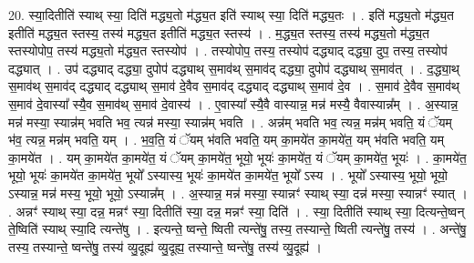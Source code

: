 \documentclass[17pt]{extarticle}
\begin{document}
20. स्या॒दितीति॑ स्याथ् स्या॒ दिति॑ मद्ध्य॒तो म॑द्ध्य॒त इति॑ स्याथ् स्या॒ दिति॑ मद्ध्य॒तः । . इति॑ मद्ध्य॒तो म॑द्ध्य॒त इतीति॑ मद्ध्य॒त स्तस्य॒ तस्य॑ मद्ध्य॒त इतीति॑ मद्ध्य॒त स्तस्य॑ । . म॒द्ध्य॒त स्तस्य॒ तस्य॑ मद्ध्य॒तो म॑द्ध्य॒त स्तस्योपोप॒ तस्य॑ मद्ध्य॒तो म॑द्ध्य॒त स्तस्योप॑ । . तस्योपोप॒ तस्य॒ तस्योप॑ दद्ध्याद् दद्ध्या॒ दुप॒ तस्य॒ तस्योप॑ दद्ध्यात् । . उप॑ दद्ध्याद् दद्ध्या॒ दुपोप॑ दद्ध्याथ् स॒माव॑थ् स॒माव॑द् दद्ध्या॒ दुपोप॑ दद्ध्याथ् स॒माव॑त् । . द॒द्ध्या॒थ् स॒माव॑थ् स॒माव॑द् दद्ध्याद् दद्ध्याथ् स॒माव॑ दे॒वैव स॒माव॑द् दद्ध्याद् दद्ध्याथ् स॒माव॑ दे॒व । . स॒माव॑ दे॒वैव स॒माव॑थ् स॒माव॑ दे॒वास्या᳚ स्यै॒व स॒माव॑थ् स॒माव॑ दे॒वास्य॑ । . ए॒वास्या᳚ स्यै॒वै वास्यान्न॒ मन्न॑ मस्यै॒ वैवास्यान्न᳚म् । . अ॒स्यान्न॒ मन्न॑ मस्या॒ स्यान्न॑म् भवति भव॒ त्यन्न॑ मस्या॒ स्यान्न॑म् भवति । . अन्न॑म् भवति भव॒ त्यन्न॒ मन्न॑म् भवति॒ यं ॅयम् भ॑व॒ त्यन्न॒ मन्न॑म् भवति॒ यम् । . भ॒व॒ति॒ यं ॅयम् भ॑वति भवति॒ यम् का॒मये॑त का॒मये॑त॒ यम् भ॑वति भवति॒ यम् का॒मये॑त । . यम् का॒मये॑त का॒मये॑त॒ यं ॅयम् का॒मये॑त॒ भूयो॒ भूयः॑ का॒मये॑त॒ यं ॅयम् का॒मये॑त॒ भूयः॑ । . का॒मये॑त॒ भूयो॒ भूयः॑ का॒मये॑त का॒मये॑त॒ भूयो᳚ ऽस्यास्य॒ भूयः॑ का॒मये॑त का॒मये॑त॒ भूयो᳚ ऽस्य । . भूयो᳚ ऽस्यास्य॒ भूयो॒ भूयो॒ ऽस्यान्न॒ मन्न॑ मस्य॒ भूयो॒ भूयो॒ ऽस्यान्न᳚म् । . अ॒स्यान्न॒ मन्न॑ मस्या॒ स्यान्नꣳ॑ स्याथ् स्या॒ दन्न॑ मस्या॒ स्यान्नꣳ॑ स्यात् । . अन्नꣳ॑ स्याथ् स्या॒ दन्न॒ मन्नꣳ॑ स्या॒ दितीति॑ स्या॒ दन्न॒ मन्नꣳ॑ स्या॒ दिति॑ । . स्या॒ दितीति॑ स्याथ् स्या॒ दित्यन्ते॒ष्वन् ते॒ष्विति॑ स्याथ् स्या॒दि त्यन्ते॑षु । . इत्यन्ते॒ ष्वन्ते॒ ष्विती त्यन्ते॑षु॒ तस्य॒ तस्यान्ते॒ ष्विती त्यन्ते॑षु॒ तस्य॑ । . अन्ते॑षु॒ तस्य॒ तस्यान्ते॒ ष्वन्ते॑षु॒ तस्य॑ व्यु॒दूह्य॑ व्यु॒दूह्य॒ तस्यान्ते॒ ष्वन्ते॑षु॒ तस्य॑ व्यु॒दूह्य॑ । \newline
\end{document}
